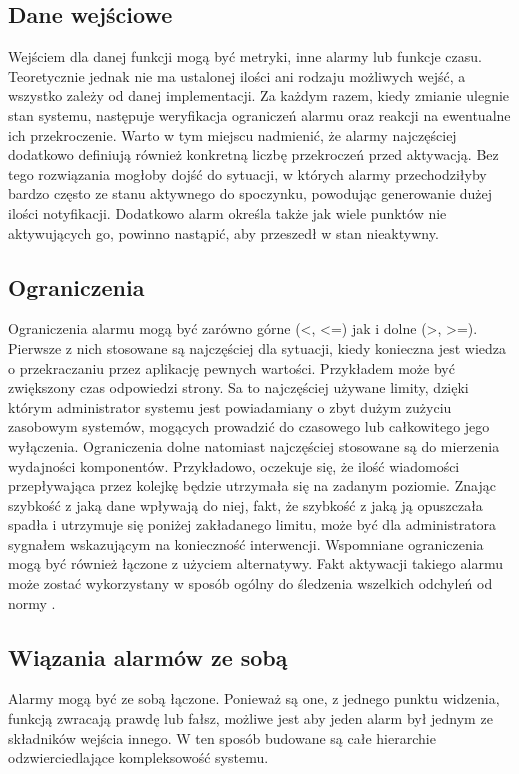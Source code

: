     \subsection{Dane wejściowe}
    Wejściem dla danej funkcji mogą być metryki, inne alarmy lub funkcje czasu. Teoretycznie jednak nie ma ustalonej
    ilości ani rodzaju możliwych wejść, a wszystko zależy od danej implementacji. Za każdym razem, kiedy 
    zmianie ulegnie stan systemu, następuje weryfikacja ograniczeń alarmu oraz reakcji na ewentualne ich
    przekroczenie. Warto w tym miejscu nadmienić, że alarmy najczęściej dodatkowo definiują również 
    konkretną liczbę przekroczeń przed aktywacją. Bez tego rozwiązania mogłoby dojść do sytuacji, w których
    alarmy przechodziłyby bardzo często ze stanu aktywnego do spoczynku, powodując generowanie dużej ilości notyfikacji. Dodatkowo alarm określa także jak wiele punktów nie aktywujących go, powinno
    nastąpić, aby przeszedł w stan nieaktywny.
    
    \subsection{Ograniczenia}
    Ograniczenia alarmu mogą być zarówno górne (<, <=) jak i dolne (>, >=). Pierwsze z nich stosowane są
    najczęściej dla sytuacji, kiedy konieczna jest wiedza o przekraczaniu przez aplikację pewnych wartości.
    Przykładem może być zwiększony czas odpowiedzi strony. Sa to najczęściej używane limity, dzięki którym
    administrator systemu jest powiadamiany o zbyt dużym zużyciu zasobowym systemów, mogących prowadzić
    do czasowego lub całkowitego jego wyłączenia. Ograniczenia dolne natomiast najczęściej
    stosowane są do mierzenia wydajności komponentów. Przykładowo, oczekuje się, że ilość wiadomości
    przepływająca przez kolejkę będzie utrzymała się na zadanym poziomie. Znając szybkość z jaką dane 
    wpływają do niej, fakt, że szybkość z jaką ją opuszczała spadła i utrzymuje się poniżej zakładanego
    limitu, może być dla administratora sygnałem wskazującym na konieczność interwencji.
    Wspomniane ograniczenia mogą być również łączone z użyciem alternatywy. Fakt aktywacji takiego
    alarmu może zostać wykorzystany w sposób ogólny do śledzenia wszelkich odchyleń od normy \cite{monitoring_and_alerting}.
    
    \subsection{Wiązania alarmów ze sobą}
    Alarmy mogą być ze sobą łączone. Ponieważ są one, z jednego punktu widzenia, funkcją
    zwracają prawdę lub fałsz, możliwe jest aby jeden alarm był jednym ze składników wejścia innego.
    W ten sposób budowane są całe hierarchie odzwierciedlające kompleksowość systemu. 
    
